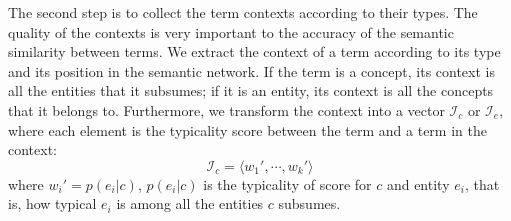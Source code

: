 The second step is to collect the term contexts according to their types.
The quality of the contexts is very important to the accuracy of the semantic similarity
between terms.
%
We extract the context of a term according to its type and its position in the
semantic network. If the term is a concept, its context is all the entities that it
subsumes; if it is an entity, its context is all the concepts that it belongs to.
Furthermore, we transform the context into a vector $\mathcal{I}_c$ or $\mathcal{I}_e$, where each element is the typicality score between the term and a term in the context:
%
\begin{equation}
\label{eq:Ic}
  \mathcal{I}_c = \langle w_1',\cdots,w_k' \rangle
\end{equation}
where $w_i' = p(e_i|c)$, $p(e_i|c)$ is the
typicality of score for $c$ and entity $e_i$, that is, how typical
$e_i$ is among all the entities $c$ subsumes.

